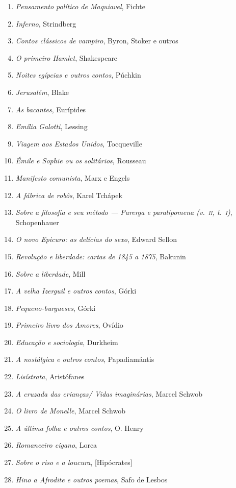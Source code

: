 \begin{enumerate}
\item \textit{Pensamento político de Maquiavel}, Fichte
\item \textit{Inferno}, Strindberg
\item \textit{Contos clássicos de vampiro}, Byron, Stoker e outros
\item \textit{O primeiro Hamlet}, Shakespeare
\item \textit{Noites egípcias e outros contos}, Púchkin
\item \textit{Jerusalém}, Blake
\item \textit{As bacantes}, Eurípides
\item \textit{Emília Galotti}, Lessing
\item \textit{Viagem aos Estados Unidos}, Tocqueville
\item \textit{Émile e Sophie ou os solitários}, Rousseau 
\item \textit{Manifesto comunista}, Marx e Engels
\item \textit{A fábrica de robôs}, Karel Tchápek 
\item \textit{Sobre a filosofia e seu método --- Parerga e paralipomena (v.~\textsc{ii}, t.~\textsc{i})}, Schopenhauer 
\item \textit{O novo Epicuro: as delícias do sexo}, Edward Sellon
\item \textit{Revolução e liberdade: cartas de 1845 a 1875}, Bakunin
\item \textit{Sobre a liberdade}, Mill
\item \textit{A velha Izerguil e outros contos}, Górki
\item \textit{Pequeno-burgueses}, Górki
\item \textit{Primeiro livro dos Amores}, Ovídio
\item \textit{Educação e sociologia}, Durkheim
\item \textit{A nostálgica e outros contos}, Papadiamántis 
\item \textit{Lisístrata}, Aristófanes 
\item \textit{A cruzada das crianças/ Vidas imaginárias}, Marcel Schwob
\item \textit{O livro de Monelle}, Marcel Schwob
\item \textit{A última folha e outros contos}, O. Henry
\item \textit{Romanceiro cigano}, Lorca
\item \textit{Sobre o riso e a loucura}, [Hipócrates]
\item \textit{Hino a Afrodite e outros poemas}, Safo de Lesbos 

\end{enumerate}
